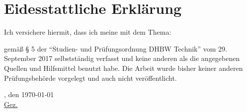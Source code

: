 \chapter*{Eidesstattliche Erklärung}
Ich versichere hiermit, dass ich meine \arbeit{} mit dem Thema:
\begin{quote}
	\textit{\titel}
\end{quote} 
gemäß § 5 der \enquote{Studien- und Prüfungsordnung DHBW Technik} vom 29. September 2017 selbstständig verfasst und keine anderen als die angegebenen Quellen und Hilfsmittel benutzt habe. Die Arbeit wurde bisher keiner anderen Prüfungsbehörde vorgelegt und auch nicht veröffentlicht.


\vspace{1cm}

\verfassungsort, den \today \\[0.5cm]
	{\underline{Gez. \autor}}
	{\makebox[6cm]{\hrulefill}}\\ 
\autorReverse
